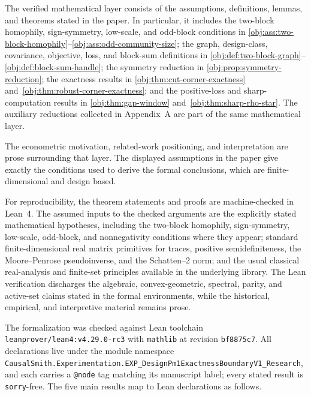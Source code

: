\documentclass[11pt]{article}
\begin{document}
The verified mathematical layer consists of the assumptions, definitions, lemmas, and theorems stated in the paper. In particular, it includes the two-block homophily, sign-symmetry, low-scale, and odd-block conditions in \cref{obj:ass:two-block-homophily}--\cref{obj:ass:odd-community-size}; the graph, design-class, covariance, objective, loss, and block-sum definitions in \cref{obj:def:two-block-graph}--\cref{obj:def:block-sum-handle}; the symmetry reduction in \cref{obj:prop:symmetry-reduction}; the exactness results in \cref{obj:thm:cut-corner-exactness} and~\cref{obj:thm:robust-corner-exactness}; and the positive-loss and sharp-computation results in \cref{obj:thm:gap-window} and~\cref{obj:thm:sharp-rho-star}. The auxiliary reductions collected in Appendix~A are part of the same mathematical layer.

The econometric motivation, related-work positioning, and interpretation are prose surrounding that layer. The displayed assumptions in the paper give exactly the conditions used to derive the formal conclusions, which are finite-dimensional and design based.

For reproducibility, the theorem statements and proofs are machine-checked in Lean~4. The assumed inputs to the checked arguments are the explicitly stated mathematical hypotheses, including the two-block homophily, sign-symmetry, low-scale, odd-block, and nonnegativity conditions where they appear; standard finite-dimensional real matrix primitives for traces, positive semidefiniteness, the Moore--Penrose pseudoinverse, and the Schatten--2 norm; and the usual classical real-analysis and finite-set principles available in the underlying library. The Lean verification discharges the algebraic, convex-geometric, spectral, parity, and active-set claims stated in the formal environments, while the historical, empirical, and interpretive material remains prose.

The formalization was checked against Lean toolchain \texttt{leanprover/lean4:v4.29.0-rc3} with \texttt{mathlib} at revision \texttt{bf8875c7}. All declarations live under the module namespace \texttt{CausalSmith.Experimentation.EXP\_DesignPm1ExactnessBoundaryV1\_Research}, and each carries a \texttt{@node} tag matching its manuscript label; every stated result is \texttt{sorry}-free. The five main results map to Lean declarations as follows.
\end{document}
